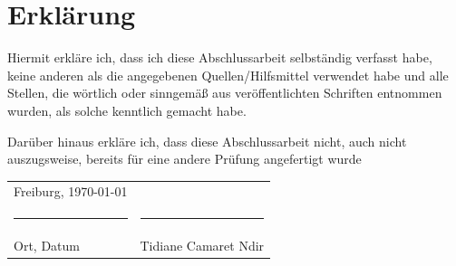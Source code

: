 \begingroup
\setlength{\parindent}{0pt}

\section*{Erklärung}

\bigskip
\bigskip
\bigskip

Hiermit erkläre ich, dass ich diese Abschlussarbeit selbständig verfasst habe, keine anderen
als die angegebenen Quellen/Hilfsmittel verwendet habe und alle Stellen, die wörtlich oder
sinngemäß aus veröffentlichten Schriften entnommen wurden, als solche kenntlich gemacht
habe.

Darüber hinaus erkläre ich, dass diese Abschlussarbeit nicht, auch nicht
auszugsweise, bereits für eine andere Prüfung angefertigt wurde

\bigskip
\bigskip
\bigskip
\bigskip
\bigskip
\bigskip

\begin{tabular}{p{} l}
    Freiburg, \today             &                              \\
    \rule{\textwidth*2/5}{0.4pt} & \rule{\textwidth*2/5}{0.4pt} \\
    Ort, Datum                   & Tidiane Camaret Ndir
\end{tabular}

\endgroup
